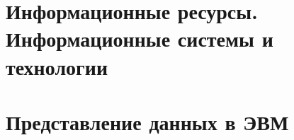 \documentclass[a4paper]{article}
\begin{document}
\section{Информационные ресурсы. Информационные системы и технологии}

\section{Представление данных в ЭВМ}
\end{document}
